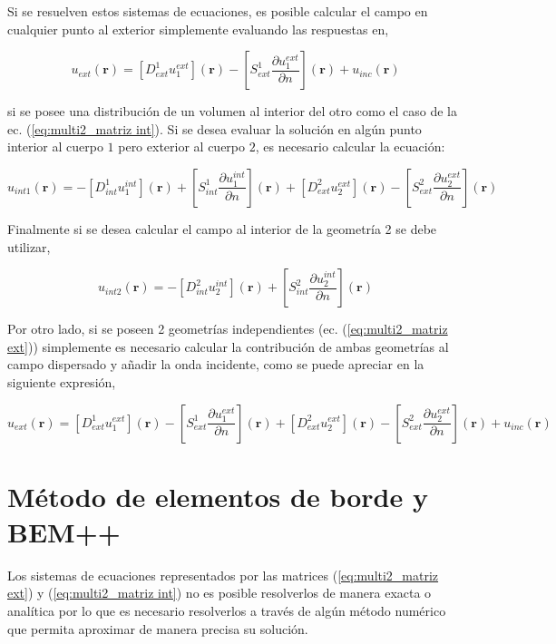 \documentclass[12pt,letterpaper]{article}
\numberwithin{equation}{section}
\begin{document}
Si se resuelven estos sistemas de ecuaciones, es posible calcular el campo en cualquier punto al exterior simplemente evaluando las respuestas en,

\begin{equation}
	u_{ext}(\textbf{r})=\left[D_{ext}^{1} u^{ext}_1\right](\textbf{r}) - \left[S_{ext}^1 \frac{\partial u^{ext}_1}{\partial n}\right](\textbf{r}) + u_{inc}(\textbf{r})
\end{equation}

si se posee una distribución de un volumen al interior del otro como el caso de la ec. (\ref{eq:multi2_matriz int}). Si se desea evaluar la solución en algún punto interior al cuerpo $1$ pero exterior al cuerpo $2$, es necesario calcular la ecuación:

\begin{equation}
	u_{int1}(\textbf{r})=-\left[D_{int}^{1} u^{int}_1\right](\textbf{r}) + \left[S_{int}^1 \frac{\partial u^{int}_1}{\partial n}\right](\textbf{r}) + \left[D_{ext}^{2} u^{ext}_2\right](\textbf{r}) - \left[S_{ext}^2 \frac{\partial u^{ext}_2}{\partial n}\right](\textbf{r})
\end{equation}

Finalmente si se desea calcular el campo al interior de la geometría 2 se debe utilizar,

\begin{equation}
u_{int2}(\textbf{r})=-\left[D_{int}^{2} u^{int}_2\right](\textbf{r}) + \left[S_{int}^2 \frac{\partial u^{int}_2}{\partial n}\right](\textbf{r})
\end{equation}

Por otro lado, si se poseen 2 geometrías independientes (ec. (\ref{eq:multi2_matriz ext})) simplemente es necesario calcular la contribución de ambas geometrías al campo dispersado y añadir la onda incidente, como se puede apreciar en la siguiente expresión,

\begin{equation}
u_{ext}(\textbf{r})=\left[D_{ext}^{1} u^{ext}_1\right](\textbf{r}) - \left[S_{ext}^1 \frac{\partial u^{ext}_1}{\partial n}\right](\textbf{r}) + \left[D_{ext}^{2} u^{ext}_2\right](\textbf{r}) - \left[S_{ext}^2 \frac{\partial u^{ext}_2}{\partial n}\right](\textbf{r}) + u_{inc}(\textbf{r})
\end{equation}

\pagebreak
\section{Método de elementos de borde y BEM++}
Los sistemas de ecuaciones representados por las matrices (\ref{eq:multi2_matriz ext}) y (\ref{eq:multi2_matriz int}) no es posible resolverlos de manera exacta o analítica por lo que es necesario resolverlos a través de algún método numérico que permita aproximar de manera precisa su solución.
\end{document}
